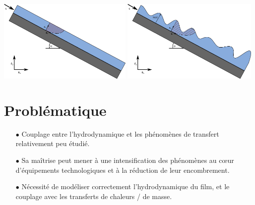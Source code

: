 \documentclass[a0,portrait,11pt]{a0poster}
\begin{document}
\begin{multicols}{2}
\begin{multicols}{2}
    \begin{center}\vspace{.2cm}
    \end{center}\vspace{.2cm}
    \columnbreak
    \begin{center}\vspace{.5cm}
    	\includegraphics[height=4cm]{thinfilm}
        \includegraphics[height=4cm]{thinfilm_unstable}
    \end{center}\vspace{.5cm}
\end{multicols}

\color{DarkSlateGray} %

\section*{Problématique}
\begin{itemize}
	\item[$\bullet$] Couplage entre l'hydrodynamique et les phénomènes de transfert relativement peu étudié.
	\item[$\bullet$] Sa maîtrise peut mener à une intensification des phénomènes au cœur d'équipements technologiques et à la réduction de leur encombrement.
	\item[$\bullet$] Nécessité de modéliser correctement l'hydrodynamique du film, et le couplage avec les transferts de chaleurs / de masse.
\end{itemize}


\end{multicols}
\end{document}
